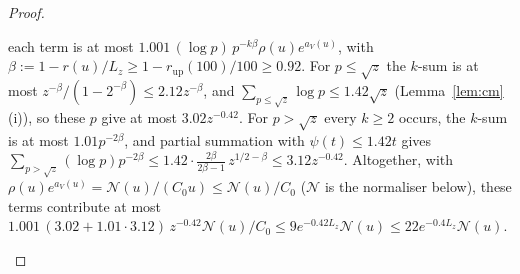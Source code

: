 \begin{proof}
\begin{itemize}
  each term is at most $1.001\,(\log p)\,p^{-k\beta}\rho(u)e^{a_V(u)}$, with $\beta:=1-r(u)/L_z\ge1-r_{\mathrm{up}}(100)/100\ge0.92$.
  For $p\le\sqrt z$ the $k$-sum is at most $z^{-\beta}/(1-2^{-\beta})\le2.12z^{-\beta}$, and
  $\sum_{p\le\sqrt z}\log p\le1.42\sqrt z$ (Lemma~\ref{lem:cm}(i)), so these $p$ give at most $3.02z^{-0.42}$. For $p>\sqrt z$
  every $k\ge2$ occurs, the $k$-sum is at most $1.01p^{-2\beta}$, and partial summation with $\psi(t)\le1.42t$ gives
  $\sum_{p>\sqrt z}(\log p)p^{-2\beta}\le1.42\cdot\frac{2\beta}{2\beta-1}\,z^{1/2-\beta}\le3.12z^{-0.42}$. Altogether, with
  $\rho(u)e^{a_V(u)}=\mathcal N(u)/(C_0u)\le\mathcal N(u)/C_0$ ($\mathcal N$ is the normaliser below), these terms contribute at
  most $1.001\,(3.02+1.01\cdot3.12)\,z^{-0.42}\mathcal N(u)/C_0\le9e^{-0.42L_z}\mathcal N(u)\le22e^{-0.4L_z}\mathcal N(u)$.
\end{itemize}


\end{proof}
